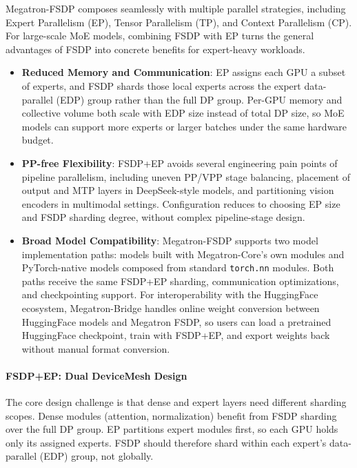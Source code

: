 Megatron-FSDP composes seamlessly with multiple parallel strategies, including Expert Parallelism (EP), Tensor Parallelism (TP), and Context Parallelism (CP). For large-scale MoE models, combining FSDP with EP turns the general advantages of FSDP into concrete benefits for expert-heavy workloads.

\begin{itemize}[itemsep=2pt]
  \item \textbf{Reduced Memory and Communication}: EP assigns each GPU a subset of experts, and FSDP shards those local experts across the expert data-parallel (EDP) group rather than the full DP group. Per-GPU memory and collective volume both scale with EDP size instead of total DP size, so MoE models can support more experts or larger batches under the same hardware budget.

  \item \textbf{PP-free Flexibility}: FSDP+EP avoids several engineering pain points of pipeline parallelism, including uneven PP/VPP stage balancing, placement of output and MTP layers in DeepSeek-style models, and partitioning vision encoders in multimodal settings. Configuration reduces to choosing EP size and FSDP sharding degree, without complex pipeline-stage design.

  \item \textbf{Broad Model Compatibility}: Megatron-FSDP supports two model implementation paths: models built with Megatron-Core's own modules and PyTorch-native models composed from standard \texttt{torch.nn} modules. Both paths receive the same FSDP+EP sharding, communication optimizations, and checkpointing support. For interoperability with the HuggingFace ecosystem, Megatron-Bridge handles online weight conversion between HuggingFace models and Megatron FSDP, so users can load a pretrained HuggingFace checkpoint, train with FSDP+EP, and export weights back without manual format conversion.
\end{itemize}

\paragraph{FSDP+EP: Dual DeviceMesh Design}

The core design challenge is that dense and expert layers need different sharding scopes. Dense modules (attention, normalization) benefit from FSDP sharding over the full DP group. EP partitions expert modules first, so each GPU holds only its assigned experts. FSDP should therefore shard within each expert's data-parallel (EDP) group, not globally.

